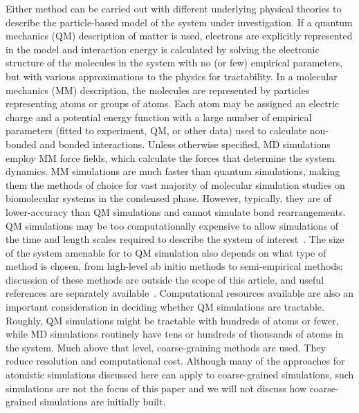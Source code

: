 \documentclass[9pt,bestpractices]{livecoms}
\begin{document}
Either method can be carried out with different underlying physical theories to describe the particle-based model of the system under investigation.
If a quantum mechanics (QM) description of matter is used, electrons are explicitly represented in the model and interaction energy is calculated by solving the electronic structure of the molecules in the system with no (or few) empirical parameters, but with various approximations to the physics for tractability.
In a molecular mechanics (MM) description, the molecules are represented by particles representing atoms or groups of atoms. Each atom may be assigned an electric charge and a potential energy function with a large number of empirical parameters (fitted to experiment, QM, or other data) used to calculate non-bonded and bonded interactions. Unless otherwise specified, MD simulations employ MM force fields, which calculate the forces that determine the system dynamics.
MM simulations are much faster than quantum simulations, making them the methods of choice for vast majority of molecular simulation studies on biomolecular systems in the condensed phase.
However, typically, they are of lower-accuracy than QM simulations and cannot simulate bond rearrangements.
QM simulations may be too computationally expensive to allow simulations of the time and length scales required to describe the system of interest~\cite{Bottaro2018}.
The size of the system amenable for to QM simulation also depends on what type of method is chosen, from high-level ab initio methods to semi-empirical methods; discussion of these methods are outside the scope of this article, and useful references are separately available~\cite{Jensen2007}.
Computational resources available are also an important consideration in deciding whether QM simulations are tractable. Roughly, QM simulations might be tractable with hundreds of atoms or fewer, while MD simulations routinely have tens or hundreds of thousands of atoms in the system. Much above that level, coarse-graining methods are used.
They reduce resolution and computational cost. Although many of the approaches for atomistic simulations discussed here can apply to coarse-grained simulations, such simulations are not the focus of this paper and we will not discuss how coarse-grained simulations are initially built.
\end{document}
